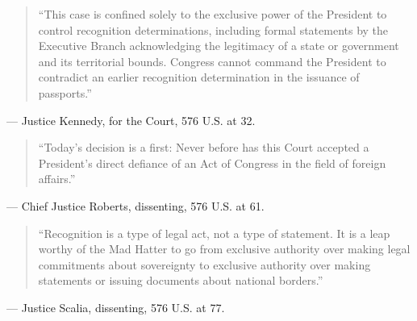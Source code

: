 \documentclass[12pt]{article}
\begin{document}
\begin{quote}
``This case is confined solely to the exclusive power of the President to control recognition determinations, including formal statements by the Executive Branch acknowledging the legitimacy of a state or government and its territorial bounds. Congress cannot command the President to contradict an earlier recognition determination in the issuance of passports.''
\end{quote}
\noindent --- Justice Kennedy, for the Court, 576 U.S. at 32.

\begin{quote}
``Today's decision is a first: Never before has this Court accepted a President's direct defiance of an Act of Congress in the field of foreign affairs.''
\end{quote}
\noindent --- Chief Justice Roberts, dissenting, 576 U.S. at 61.

\begin{quote}
``Recognition is a type of legal act, not a type of statement. It is a leap worthy of the Mad Hatter to go from exclusive authority over making legal commitments about sovereignty to exclusive authority over making statements or issuing documents about national borders.''
\end{quote}
\noindent --- Justice Scalia, dissenting, 576 U.S. at 77.
\end{document}
